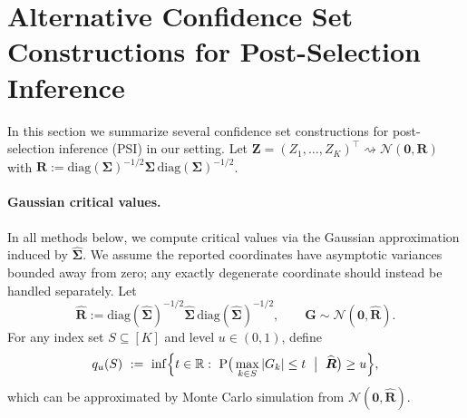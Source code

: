 \documentclass[12pt]{article}
\theoremstyle{remark}\newtheorem{remark}[theorem]{Remark}\theoremstyle{plain}
\newcommand{\pr}{\mathrm{P}}
\begin{document}
\section{Alternative Confidence Set Constructions for Post-Selection Inference}\label{sec:psi_other_methods}

In this section we summarize several confidence set constructions for post-selection inference (PSI)
in our setting.
Let $\bm{Z}=(Z_1,\dots,Z_K)^\top \rightsquigarrow \mathcal{N}(\bm{0},\boldsymbol{R})$ with
$\boldsymbol{R}:=\mathrm{diag}(\boldsymbol{\Sigma})^{-1/2}\boldsymbol{\Sigma}\,\mathrm{diag}(\boldsymbol{\Sigma})^{-1/2}$.

\paragraph{Gaussian critical values.}
In all methods below, we compute critical values via the Gaussian approximation induced by
$\widehat{\boldsymbol{\Sigma}}$.
We assume the reported coordinates have asymptotic variances bounded
away from zero; any exactly degenerate coordinate should instead be
handled separately.
Let
\[
\widehat{\boldsymbol{R}}
:=
\mathrm{diag}(\widehat{\boldsymbol{\Sigma}})^{-1/2}\widehat{\boldsymbol{\Sigma}}\,
\mathrm{diag}(\widehat{\boldsymbol{\Sigma}})^{-1/2},
\qquad
\bm{G}\sim \mathcal{N}(\bm{0},\widehat{\boldsymbol{R}}).
\]
For any index set $S\subseteq[K]$ and level $u\in(0,1)$, define
\begin{equation}\label{eq:q_def_general}
q_u(S)
\ :=\ 
\inf\Bigl\{t\in\mathbb{R}:\ \pr\big(\max_{k\in S}|G_k|\le t \ \bigm|\ \widehat{\boldsymbol{R}}\big)\ge u\Bigr\},
\end{equation}
which can be approximated by Monte Carlo simulation from $\mathcal{N}(\bm{0},\widehat{\boldsymbol{R}})$.
\end{document}
